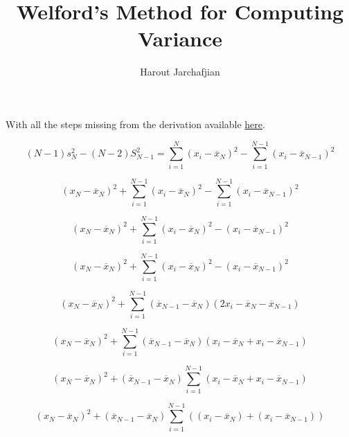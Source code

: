 \documentclass{article}
\newcommand*\mean[1]{\overline{#1}}
\begin{document}
\title{Welford's Method for Computing Variance}
\author{Harout Jarchafjian}

\maketitle

\begin{center}
With all the steps missing from the derivation available \href{https://jonisalonen.com/2013/deriving-welfords-method-for-computing-variance/}{here}.
\end{center}

\begin{equation}
    (N - 1)s_N^2 - (N-2)S_{N-1}^2 = \sum_{i=1}^{N} (x_i - \mean{x}_N)^2 - \sum_{i=1}^{N-1} (x_i - \mean{x}_{N-1})^2
\end{equation}

\begin{equation}
     (x_N - \mean{x}_N)^2 + \sum_{i=1}^{N-1} (x_i - \mean{x}_N)^2 - \sum_{i=1}^{N-1} (x_i - \mean{x}_{N-1})^2
\end{equation}

\begin{equation}
     (x_N - \mean{x}_N)^2 + \sum_{i=1}^{N-1} (x_i - \mean{x}_N)^2 - (x_i - \mean{x}_{N-1})^2
\end{equation}

\begin{equation}
     (x_N - \mean{x}_N)^2 + \sum_{i=1}^{N-1} (x_i - \mean{x}_N)^2 - (x_i - \mean{x}_{N-1})^2
\end{equation}


\begin{equation}
     (x_N - \mean{x}_N)^2 + \sum_{i=1}^{N-1} (\mean{x}_{N-1} - \mean{x}_N)(2x_i - \mean{x}_N - \mean{x}_{N-1})
\end{equation}
 
\begin{equation}
     (x_N - \mean{x}_N)^2 + \sum_{i=1}^{N-1} (\mean{x}_{N-1} - \mean{x}_N)(x_i - \mean{x}_N + x_i - \mean{x}_{N-1})
\end{equation}

 
\begin{equation}
     (x_N - \mean{x}_N)^2 + (\mean{x}_{N-1} - \mean{x}_N)\sum_{i=1}^{N-1} (x_i - \mean{x}_N + x_i - \mean{x}_{N-1})
\end{equation}

\begin{equation}
     (x_N - \mean{x}_N)^2 + (\mean{x}_{N-1} - \mean{x}_N)\sum_{i=1}^{N-1}( (x_i - \mean{x}_N) + (x_i - \mean{x}_{N-1}))
\end{equation}
\end{document}

